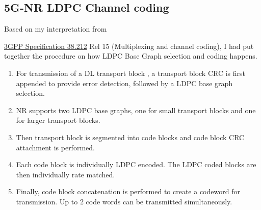 \documentclass[journal,twocolumn]{IEEEtran}
\begin{document}
\subsection{\textbf{
5G-NR LDPC Channel coding}}
Based on my interpretation from {\href{https://www.etsi.org/deliver/etsi_ts/138200_138299/138212/17.01.00_60/ts_138212v170100p.pdf}{3GPP Specification 38.212} Rel 15 (Multiplexing and channel coding), I had put together the procedure on how LDPC Base Graph selection and coding happens.
\begin{enumerate}
  \item For transmission of a DL transport block , a transport block CRC is first appended to provide error detection, followed by a LDPC base graph selection.
  \item   NR supports two LDPC base graphs, one for small transport blocks and one for larger transport blocks.
   \item  Then transport block is segmented into code blocks and code block CRC attachment is performed.
   \item  Each code block is individually LDPC encoded. The LDPC coded blocks are then individually rate matched.
  \item   Finally, code block concatenation is performed to create a codeword for transmission. Up to 2 code words can be transmitted simultaneously. 
    \end{enumerate}
}
\end{document}
